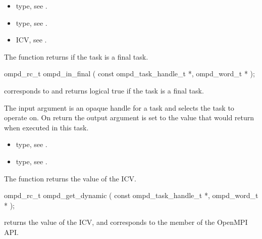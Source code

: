 \crossreferences
\begin{itemize}
	\item {} type, see .
	\item {} type, see .
	\item {} ICV, see .
\end{itemize}


\label{ompd:ompd_in_final}
\summary
The  function returns  if the task is a final task.

\format
\begin{cspecific}
\begin{ompSyntax}
ompd_rc_t ompd_in_final (
  const ompd_task_handle_t *,
  ompd_word_t *
);
\end{ompSyntax}
\end{cspecific}

\descr
{} corresponds to  and returns
logical true if the task is a final task.

\argdesc
The input argument  is an opaque handle for a task and selects the task to operate on.
On return the output argument  is set to the value that  would return when
executed in this task.

\crossreferences
\begin{itemize}
	\item {} type, see .
	\item {} type, see .
\end{itemize}


\label{ompd:ompd_get_dynamic}
\summary
The  function returns the value of the  ICV.

\format
\begin{cspecific}
\begin{ompSyntax}
ompd_rc_t ompd_get_dynamic (
  const ompd_task_handle_t *,
  ompd_word_t *
);
\end{ompSyntax}
\end{cspecific}

\descr
{} returns the value of the
 ICV,
and corresponds to the  member of the OpenMPI API.

